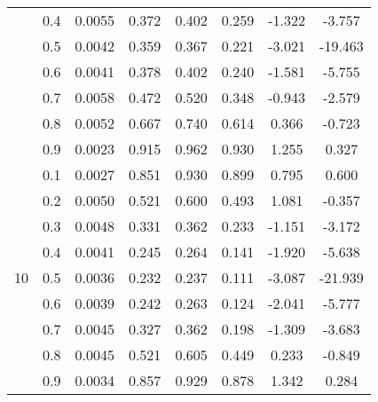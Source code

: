\documentclass[11pt,a4paper]{report}
\begin{document}
\begin{longtable}{ | c | c || c | c | c | c | c | c | }
 & 0.4 & 0.0055 & 0.372 & 0.402 & 0.259 & -1.322 & -3.757 \\
 & 0.5 & 0.0042 & 0.359 & 0.367 & 0.221 & -3.021 & -19.463 \\
 & 0.6 & 0.0041 & 0.378 & 0.402 & 0.240 & -1.581 & -5.755 \\
 & 0.7 & 0.0058 & 0.472 & 0.520 & 0.348 & -0.943 & -2.579 \\
 & 0.8 & 0.0052 & 0.667 & 0.740 & 0.614 & 0.366 & -0.723 \\
 & 0.9 & 0.0023 & 0.915 & 0.962 & 0.930 & 1.255 & 0.327 \\
 \hline
\multirow{9}{*}{10} & 0.1 & 0.0027 & 0.851 & 0.930 & 0.899 & 0.795 & 0.600 \\
 & 0.2 & 0.0050 & 0.521 & 0.600 & 0.493 & 1.081 & -0.357 \\
 & 0.3 & 0.0048 & 0.331 & 0.362 & 0.233 & -1.151 & -3.172 \\
 & 0.4 & 0.0041 & 0.245 & 0.264 & 0.141 & -1.920 & -5.638 \\
 & 0.5 & 0.0036 & 0.232 & 0.237 & 0.111 & -3.087 & -21.939 \\
 & 0.6 & 0.0039 & 0.242 & 0.263 & 0.124 & -2.041 & -5.777 \\
 & 0.7 & 0.0045 & 0.327 & 0.362 & 0.198 & -1.309 & -3.683 \\
 & 0.8 & 0.0045 & 0.521 & 0.605 & 0.449 & 0.233 & -0.849 \\
 & 0.9 & 0.0034 & 0.857 & 0.929 & 0.878 & 1.342 & 0.284 \\
 \hline
\hline
\end{longtable}
\end{document}
